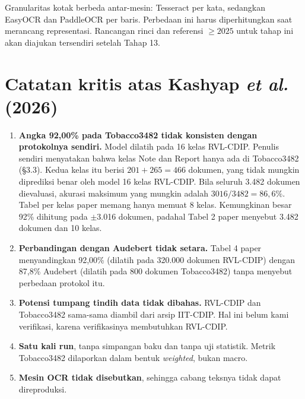 \documentclass[11pt,a4paper]{article}
\begin{document}
Granularitas kotak berbeda antar-mesin: Tesseract per kata, sedangkan EasyOCR dan
PaddleOCR per baris. Perbedaan ini harus diperhitungkan saat merancang representasi.
Rancangan rinci dan referensi $\geq 2025$ untuk tahap ini akan diajukan tersendiri
setelah Tahap 13.

\appendix
\section{Catatan kritis atas Kashyap \textit{et al.} (2026)}\label{app:kashyap}

\begin{enumerate}
  \item \textbf{Angka 92,00\% pada Tobacco3482 tidak konsisten dengan protokolnya
  sendiri.} Model dilatih pada 16 kelas RVL-CDIP. Penulis sendiri menyatakan bahwa kelas
  Note dan Report hanya ada di Tobacco3482 (§3.3). Kedua kelas itu berisi $201 + 265 =
  466$ dokumen, yang tidak mungkin diprediksi benar oleh model 16 kelas RVL-CDIP. Bila
  seluruh 3.482 dokumen dievaluasi, akurasi maksimum yang mungkin adalah $3016/3482 =
  86{,}6\%$. Tabel per kelas paper memang hanya memuat 8 kelas. Kemungkinan besar 92\%
  dihitung pada $\pm$3.016 dokumen, padahal Tabel 2 paper menyebut 3.482 dokumen dan
  10 kelas.
  \item \textbf{Perbandingan dengan Audebert tidak setara.} Tabel 4 paper menyandingkan
  92,00\% (dilatih pada 320.000 dokumen RVL-CDIP) dengan 87,8\% Audebert (dilatih pada
  800 dokumen Tobacco3482) tanpa menyebut perbedaan protokol itu.
  \item \textbf{Potensi tumpang tindih data tidak dibahas.} RVL-CDIP dan Tobacco3482
  sama-sama diambil dari arsip IIT-CDIP. Hal ini belum kami verifikasi, karena
  verifikasinya membutuhkan RVL-CDIP.
  \item \textbf{Satu kali run}, tanpa simpangan baku dan tanpa uji statistik. Metrik
  Tobacco3482 dilaporkan dalam bentuk \textit{weighted}, bukan macro.
  \item \textbf{Mesin OCR tidak disebutkan}, sehingga cabang teksnya tidak dapat
  direproduksi.
\end{enumerate}
\end{document}
